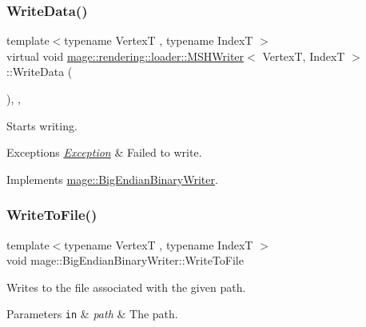 \subsubsection{\texorpdfstring{Write\+Data()}{WriteData()}}
{\footnotesize\ttfamily template$<$typename VertexT , typename IndexT $>$ \\
virtual void \mbox{\hyperlink{classmage_1_1rendering_1_1loader_1_1_m_s_h_writer}{mage\+::rendering\+::loader\+::\+M\+S\+H\+Writer}}$<$ VertexT, IndexT $>$\+::Write\+Data (\begin{DoxyParamCaption}{ }\end{DoxyParamCaption})\hspace{0.3cm}{\ttfamily [override]}, {\ttfamily [private]}, {\ttfamily [virtual]}}

Starts writing.


\begin{DoxyExceptions}{Exceptions}
{\em \mbox{\hyperlink{classmage_1_1_exception}{Exception}}} & Failed to write. \\
\hline
\end{DoxyExceptions}


Implements \mbox{\hyperlink{classmage_1_1_big_endian_binary_writer_a719581274b1b185ef05687183f7ded25}{mage\+::\+Big\+Endian\+Binary\+Writer}}.

\mbox{\label{classmage_1_1rendering_1_1loader_1_1_m_s_h_writer_a6ce9780687a45a6c6f98e0843190b63b}} 
\subsubsection{\texorpdfstring{Write\+To\+File()}{WriteToFile()}}
{\footnotesize\ttfamily template$<$typename VertexT , typename IndexT $>$ \\
void mage\+::\+Big\+Endian\+Binary\+Writer\+::\+Write\+To\+File}

Writes to the file associated with the given path.


\begin{DoxyParams}[1]{Parameters}
\mbox{\tt in}  & {\em path} & The path. \\
\hline
\end{DoxyParams}


